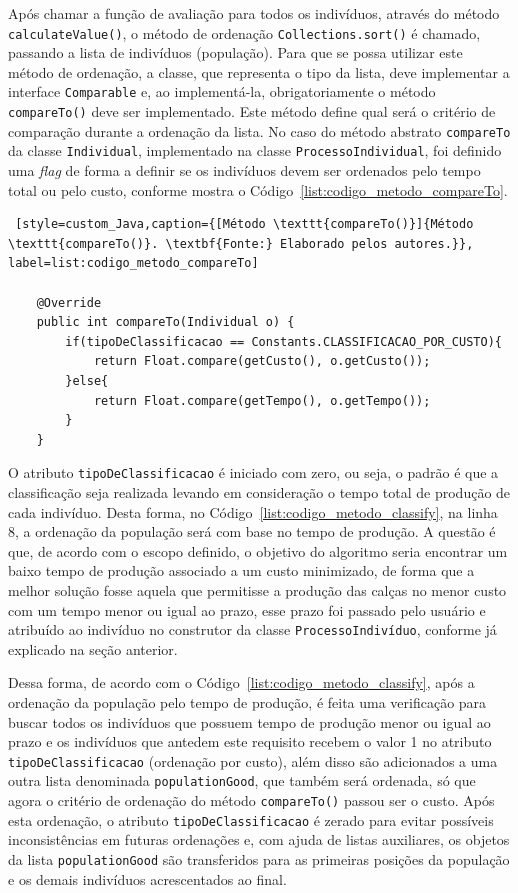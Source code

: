 \par Após chamar a função de avaliação para todos os indivíduos, através do método \texttt{calcul\-ateValue()}, o método
de ordenação \texttt{Collections.sort()} é chamado, passando a lista de indivíduos (população). Para que se possa utilizar este método
de ordenação, a classe, que representa o tipo da lista, deve implementar a interface
\texttt{Comparable} e, ao implementá-la, obrigatoriamente o método \texttt{compareTo()} deve ser implementado. Este método
define qual será o critério de comparação durante a ordenação da lista. No caso do método abstrato \texttt{compareTo} da classe \texttt{Individual}, implementado na classe \texttt{ProcessoIndividual}, foi definido uma \textit{flag} de forma a
definir se os indivíduos devem ser ordenados pelo tempo total ou pelo custo, conforme mostra o Código~\ref{list:codigo_metodo_compareTo}.

\begin{lstlisting} [style=custom_Java,caption={[Método \texttt{compareTo()}]{Método \texttt{compareTo()}. \textbf{Fonte:} Elaborado pelos autores.}}, label=list:codigo_metodo_compareTo] 

	@Override
	public int compareTo(Individual o) {
		if(tipoDeClassificacao == Constants.CLASSIFICACAO_POR_CUSTO){
			return Float.compare(getCusto(), o.getCusto());
		}else{
			return Float.compare(getTempo(), o.getTempo());
		}
	}

\end{lstlisting}

\par O atributo \texttt{tipoDeClassificacao} é iniciado com zero, ou seja, o padrão é que a classificação seja realizada levando 
em consideração o tempo total de produção de cada indivíduo. Desta forma, no Código~\ref{list:codigo_metodo_classify}, na linha
8, a ordenação da população será com base no tempo de produção. A questão é que, de acordo com o escopo definido, o objetivo do 
algoritmo seria encontrar um baixo tempo de produção associado a um custo minimizado, de forma que a melhor solução fosse aquela
que permitisse a produção das calças no menor custo com um tempo menor ou igual ao prazo, esse prazo foi passado pelo usuário e
atribuído ao indivíduo no construtor da classe \texttt{ProcessoIndivíduo}, conforme já explicado na seção anterior. 

\par Dessa forma, de acordo com o Código~\ref{list:codigo_metodo_classify}, após a ordenação da população pelo tempo de produção, 
é feita uma verificação para buscar todos os indivíduos que possuem tempo de produção menor ou igual ao prazo e os indivíduos que antedem este requisito recebem o valor 1 no atributo \texttt{tipoDeClassificacao} (ordenação por custo), além disso são adicionados a uma outra lista denominada \texttt{populationGood}, que também será ordenada, só que agora o critério de ordenação do método \texttt{compareTo()} passou ser o custo. Após esta ordenação, o atributo \texttt{tipoDeClassificacao} é zerado para evitar possíveis inconsistências em futuras ordenações e, com ajuda de listas auxiliares, os objetos da lista \texttt{populationGood} são transferidos para as primeiras posições da população e os demais indivíduos acrescentados ao final.

